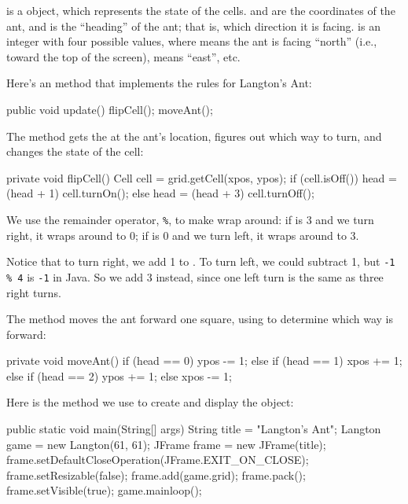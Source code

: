 is a  object, which represents the state of the cells.
 and  are the coordinates of the ant, and  is the ``heading'' of the ant; that is, which direction it is facing.
 is an integer with four possible values, where  means the ant is facing ``north'' (i.e., toward the top of the screen),  means ``east'', etc.

Here's an  method that implements the rules for Langton's Ant:

\begin{code}
public void update() {
    flipCell();
    moveAnt();
}
\end{code}

The  method gets the  at the ant's location, figures out which way to turn, and changes the state of the cell:

\begin{code}
private void flipCell() {
    Cell cell = grid.getCell(xpos, ypos);
    if (cell.isOff()) {
        head = (head + 1) %
        cell.turnOn();
    } else {
        head = (head + 3) %
        cell.turnOff();
    }
}
\end{code}

We use the remainder operator, \verb"%", to make  wrap around: if  is 3 and we turn right, it wraps around to 0; if  is 0 and we turn left, it wraps around to 3.

Notice that to turn right, we add 1 to .
To turn left, we could subtract 1, but \verb"-1 % 4" is \verb"-1" in Java.
So we add 3 instead, since one left turn is the same as three right turns.

The  method moves the ant forward one square, using  to determine which way is forward:

\begin{code}
private void moveAnt() {
    if (head == 0) {
        ypos -= 1;
    } else if (head == 1) {
        xpos += 1;
    } else if (head == 2) {
        ypos += 1;
    } else {
        xpos -= 1;
    }
}
\end{code}

Here is the  method we use to create and display the  object:

\begin{code}
public static void main(String[] args) {
    String title = "Langton's Ant";
    Langton game = new Langton(61, 61);
    JFrame frame = new JFrame(title);
    frame.setDefaultCloseOperation(JFrame.EXIT_ON_CLOSE);
    frame.setResizable(false);
    frame.add(game.grid);
    frame.pack();
    frame.setVisible(true);
    game.mainloop();
}
\end{code}

